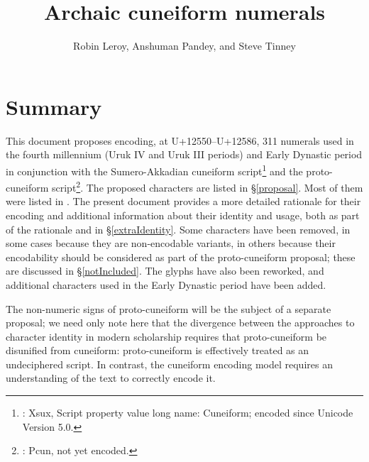 \documentclass[10pt, a4paper, twoside]{article}
\title{Archaic cuneiform numerals}
\author{Robin Leroy, Anshuman Pandey, and Steve Tinney}
\begin{document}
\maketitle

\tableofcontents

\section{Summary}

This document proposes encoding, at U+12550--U+12586, 311 numerals
used in the fourth millennium (Uruk IV and Uruk III periods) and Early Dynastic period in conjunction
with the Sumero-Akkadian cuneiform script\footnote{\cite{ISO15924}: Xsux, Script property value long name: Cuneiform; encoded since Unicode Version 5.0.}
and the proto-cuneiform script\footnote{\cite{ISO15924}: Pcun, not yet encoded.}.
The proposed characters are listed in §\ref{proposal}.
Most of them were listed in \cite{L2/23-190}.
The present document provides a more detailed rationale for their encoding
and additional information about their identity and usage,
both as part of the rationale and in §\ref{extraIdentity}. Some characters have been
removed, in some cases because they are non-encodable variants,
in others because their encodability should be considered as part of the proto-cuneiform proposal;
these are discussed in §\ref{notIncluded}.
The glyphs have also been reworked, and
additional characters used in the Early Dynastic period have been added.

The non-numeric signs of proto-cuneiform will be the subject of a separate proposal;
we need only note here that the divergence between the approaches to character identity
in modern scholarship requires that proto-cuneiform be disunified from cuneiform:
proto-cuneiform is effectively treated as an undeciphered script.
In contrast, the cuneiform encoding model requires an understanding of the text to correctly encode it.
\end{document}
